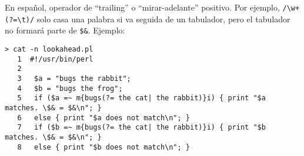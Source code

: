 \begin{it}
En español, operador de ``trailing'' o ``mirar-adelante'' positivo. 
Por ejemplo, \verb|/\w+(?=\t)/| solo casa una palabra si va seguida de un tabulador, pero el tabulador no formará parte de \verb|$&|.
Ejemplo:
\begin{latexonly}
\begin{verbatim}
> cat -n lookahead.pl
   1  #!/usr/bin/perl
   2  
   3   $a = "bugs the rabbit";
   4   $b = "bugs the frog";
   5   if ($a =~ m{bugs(?= the cat| the rabbit)}i) { print "$a matches. \$& = $&\n"; }
   6   else { print "$a does not match\n"; }
   7   if ($b =~ m{bugs(?= the cat| the rabbit)}i) { print "$b matches. \$& = $&\n"; }
   8   else { print "$b does not match\n"; }
\end{verbatim}
\end{latexonly}
\begin{rawhtml}


\end{rawhtml}
\end{it}
